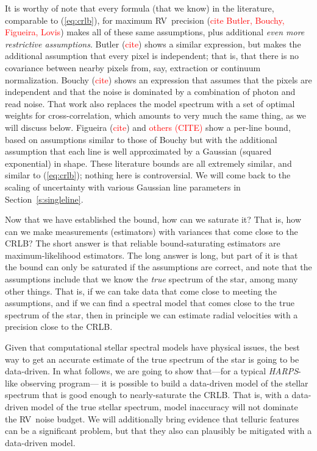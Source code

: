 \documentclass[modern]{aastex63}
\newcommand{\sectionname}{Section}
\newcommand{\todo}[1]{\textcolor{red}{#1}}  %
\newcommand{\CITE}{\todo{CITE}}
\newcommand{\acronym}[1]{{\small{#1}}}
\newcommand{\project}[1]{\textsl{#1}}
\newcommand{\HARPS}{\project{\acronym{HARPS}}}
\newcommand{\RV}{\acronym{RV}}
\newcommand{\CRLB}{\acronym{CRLB}}
\begin{document}
It is worthy of note that every formula (that we know) in the
literature, comparable to (\ref{eq:crlb}), for maximum \RV\ precision (\todo{cite Butler, Bouchy,
  Figueira, Lovis}) makes all of these same assumptions,
plus additional \emph{even more restrictive assumptions}.
Butler (\todo{cite}) shows a similar expression, but makes the additional
assumption that every pixel is independent; that is, that there is no
covariance between nearby pixels from, say, extraction or continuum normalization.
Bouchy (\todo{cite}) shows an expression that assumes that the pixels
are independent and that the noise is dominated by a combination of photon
and read noise. 
That work also replaces the model spectrum with a set of optimal
weights for cross-correlation, which amounts to very much the same thing,
as we will discuss below.
Figueira (\todo{cite}) and \todo{others (\CITE)} show a per-line
bound, based on assumptions similar to those of Bouchy but with the additional assumption that
each line is well approximated by a Gaussian (squared exponential) in shape.
These literature bounds are all extremely similar, and similar to (\ref{eq:crlb});
nothing here is controversial.
We will come back to the scaling of uncertainty with various
Gaussian line parameters in \sectionname~\ref{s:singleline}.

Now that we have established the bound, how can we saturate it? That is,
how can we make measurements (estimators) with variances that come close to the \CRLB?
The short answer is that reliable bound-saturating estimators are maximum-likelihood estimators.
The long answer is long, but part of it is that the bound can only be saturated if the
assumptions are correct, and note that the assumptions include that we know the
\emph{true} spectrum of the star, among many other things.
That is, if we can take data that come close to meeting the assumptions, and
if we can find a spectral model that comes close to the true spectrum of the star,
then in principle we can estimate radial velocities with a precision close to the \CRLB.

Given that computational stellar spectral models have physical issues, the best way
to get an accurate estimate of the true spectrum of the star is going to be data-driven.
In what follows, we are going to show that---for a typical \HARPS-like observing program---%
it is possible to build a data-driven model of the stellar spectrum that is good enough
to nearly-saturate the \CRLB.
That is, with a data-driven model of the true stellar spectrum, model inaccuracy will
not dominate the \RV\ noise budget.
We will additionally bring evidence that telluric features can be a significant problem,
but that they also can plausibly be mitigated with a data-driven model.
\end{document}
